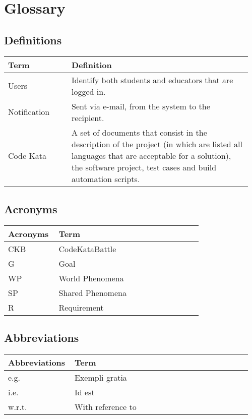 \section{Glossary}
\subsection{Definitions}
\begin{center}
	\begin{tabular}{@{}p{0.25\linewidth} p{0.71\linewidth}@{}}
		\toprule
		\textbf{Term} & \textbf{Definition}\\
		\midrule
		Users & Identify both students and educators that are logged in. \\
            Notification & Sent via e-mail, from the system to the recipient. \\
            Code Kata & A set of documents that consist in the description of the project (in which are listed all languages that are acceptable for a solution), the software project, test cases and build automation scripts. \\
		\bottomrule
	\end{tabular}
\end{center}

\subsection{Acronyms}
\begin{center}
	\begin{tabular}{@{}p{0.25\linewidth} p{0.71\linewidth}@{}}
		\toprule
		\textbf{Acronyms} & \textbf{Term}\\
		\midrule
		CKB & CodeKataBattle\\
            G & Goal\\
		WP & World Phenomena\\
		SP & Shared Phenomena\\
            R & Requirement\\
		\bottomrule
	\end{tabular}
\end{center}

\subsection{Abbreviations}
\begin{center}
	\begin{tabular}{@{}p{0.25\linewidth} p{0.71\linewidth}@{}}
		\toprule
		\textbf{Abbreviations} & \textbf{Term}\\
		\midrule
		e.g. & Exempli gratia\\
		i.e. & Id est\\
		w.r.t. & With reference to\\
		\bottomrule
	\end{tabular}
\end{center}

